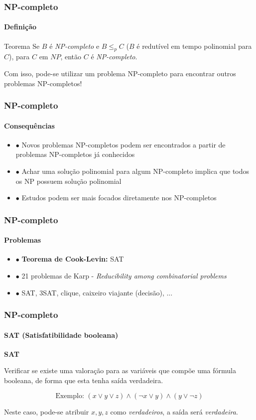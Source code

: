 \documentclass{beamer}
\begin{document}
\begin{frame}
\frametitle{NP-completo}
\framesubtitle{Definição}

\begin{block}{Teorema}
	Se $B$ é \textit{NP-completo} e $B \leq_p C$ ($B$ é redutível em tempo polinomial para $C$), para $C$ em $NP$, então $C$ é \textit{NP-completo}.
\end{block}

Com isso, pode-se utilizar um problema NP-completo para encontrar outros problemas NP-completos!

\end{frame}

\begin{frame}
\frametitle{NP-completo}
\framesubtitle{Consequências}

\begin{itemize}
    \item $\bullet$ Novos problemas NP-completos podem ser encontrados a partir de problemas NP-completos já conhecidos
    \item $\bullet$ Achar uma solução polinomial para algum NP-completo implica que todos os NP possuem solução polinomial
    \item $\bullet$ Estudos podem ser mais focados diretamente nos NP-completos
\end{itemize}

\bigskip

\end{frame}

\begin{frame}
\frametitle{NP-completo}
\framesubtitle{Problemas}

\begin{itemize}
    \item $\bullet$ \textbf{Teorema de Cook-Levin: }SAT
    \item $\bullet$ 21 problemas de Karp - \textit{Reducibility among combinatorial problems} \cite{karp1972}
    \item $\bullet$ SAT, 3SAT, clique, caixeiro viajante (decisão), ...
\end{itemize}

\bigskip

\end{frame}

\begin{frame}
\frametitle{NP-completo}
\framesubtitle{SAT (Satisfatibilidade booleana)}

\textcolor{blue(pigment)}{\textbf{SAT}}

Verificar se existe uma valoração para as variáveis que compõe uma fórmula booleana, de forma que esta tenha saída verdadeira.

$$\text{Exemplo: }(x \lor y \lor z) \wedge (\neg x \lor y) \wedge (y \lor \neg z)$$

Neste caso, pode-se atribuir $x, y, z$ como \textit{verdadeiros}, a saída será \textit{verdadeira}.

\end{frame}
\end{document}
